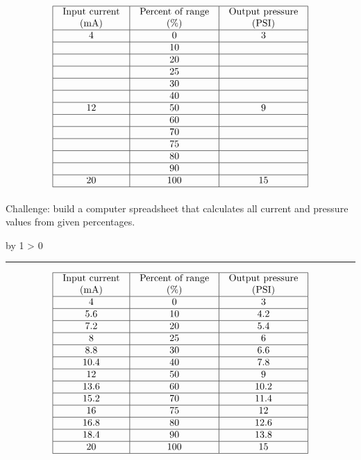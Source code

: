 \documentclass[12pt,a4paper]{article}
\def\svar{
           \advance\answnum by 1
           \ifnum \answnum > 0
                \hrule
                \vskip 3pt
                \leftline{Svar \the\answnum}
                \vskip 3pt \fi}
\begin{document}

$$\vbox{\offinterlineskip
\halign{\strut
\vrule \quad\hfil # \ \hfil & 
\vrule \quad\hfil # \ \hfil & 
\vrule \quad\hfil # \ \hfil \vrule \cr
\noalign{\hrule}
%
Input current & Percent of range & Output pressure \cr
%
(mA) & (\%) & (PSI) \cr
%
\noalign{\hrule}
%
4 & 0 & 3 \cr
%
\noalign{\hrule}
%
 & 10 &  \cr
%
\noalign{\hrule}
%
 & 20 &  \cr
%
\noalign{\hrule}
%
 & 25 &  \cr
%
\noalign{\hrule}
%
 & 30 &  \cr
%
\noalign{\hrule}
%
 & 40 &  \cr
%
\noalign{\hrule}
%
12 & 50 & 9 \cr
%
\noalign{\hrule}
%
 & 60 &  \cr
%
\noalign{\hrule}
%
 & 70 &  \cr
%
\noalign{\hrule}
%
 & 75 &  \cr
%
\noalign{\hrule}
%
 & 80 &  \cr
%
\noalign{\hrule}
%
 & 90 &  \cr
%
\noalign{\hrule}
%
20 & 100 & 15 \cr
%
\noalign{\hrule}
} %
}$$ %

Challenge: build a computer spreadsheet that calculates all current and pressure values from given percentages.

\vskip 10pt \filbreak 





\svar{} 

$$\vbox{\offinterlineskip
\halign{\strut
\vrule \quad\hfil # \ \hfil & 
\vrule \quad\hfil # \ \hfil & 
\vrule \quad\hfil # \ \hfil \vrule \cr
\noalign{\hrule}
%
Input current & Percent of range & Output pressure \cr
%
(mA) & (\%) & (PSI) \cr
%
\noalign{\hrule}
%
4 & 0 & 3 \cr
%
\noalign{\hrule}
%
5.6 & 10 & 4.2 \cr
%
\noalign{\hrule}
%
7.2 & 20 & 5.4 \cr
%
\noalign{\hrule}
%
8 & 25 & 6 \cr
%
\noalign{\hrule}
%
8.8 & 30 & 6.6 \cr
%
\noalign{\hrule}
%
10.4 & 40 & 7.8 \cr
%
\noalign{\hrule}
%
12 & 50 & 9 \cr
%
\noalign{\hrule}
%
13.6 & 60 & 10.2 \cr
%
\noalign{\hrule}
%
15.2 & 70 & 11.4 \cr
%
\noalign{\hrule}
%
16 & 75 & 12 \cr
%
\noalign{\hrule}
%
16.8 & 80 & 12.6 \cr
%
\noalign{\hrule}
%
18.4 & 90 & 13.8 \cr
%
\noalign{\hrule}
%
20 & 100 & 15 \cr
%
\noalign{\hrule}
} %
}$$ %

\vskip 10pt
\end{document}
